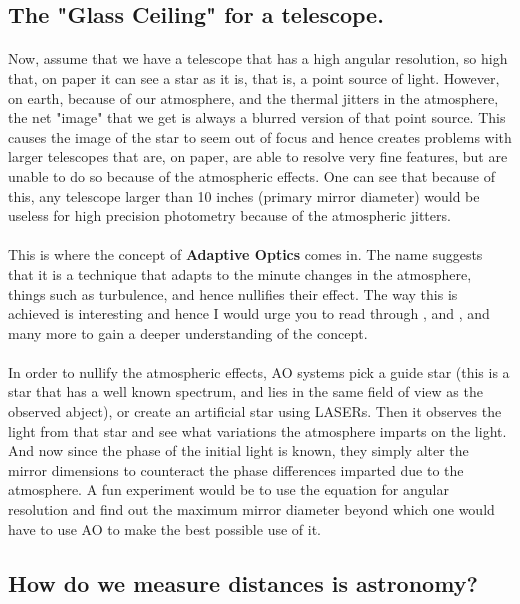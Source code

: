 \documentclass[a4paper,twoside]{article}
\numberwithin{equation}{section}
\begin{document}
\subsection{The "Glass Ceiling" for a telescope.}
\paragraph{}
Now, assume that we have a telescope that has a high angular resolution, so high that, on paper it can see a star as it is, that is, a point source of light. However, on earth, because of our atmosphere, and the thermal jitters in the atmosphere, the net "image" that we get is always a blurred version of that point source. This causes the image of the star to seem out of focus and hence creates problems with larger telescopes that are, on paper, are able to resolve very fine features, but are unable to do so because of the atmospheric effects. One can see that because of this, any telescope larger than 10 inches (primary mirror diameter) would be useless for high precision photometry because of the atmospheric jitters.
\paragraph{}
This is where the concept of \textbf{Adaptive Optics} comes in. The name suggests that it is a technique that adapts to the minute changes in the atmosphere, things such as turbulence, and hence nullifies their effect. The way this is achieved is interesting and hence I would urge you to read through \cite{AO1}, \cite{AO2} and \cite{AO3}, and many more to gain a deeper understanding of the concept. 
\paragraph{}
In order to nullify the atmospheric effects, AO systems pick a guide star (this is a star that has a well known spectrum, and lies in the same field of view as the observed abject), or create an artificial star using LASERs. Then it observes the light from that star and see what variations the atmosphere imparts on the light. And now since the phase of the initial light is known, they simply alter the mirror dimensions to counteract the phase differences imparted due to the atmosphere. A fun experiment would be to use the equation for angular resolution and find out the maximum mirror diameter beyond which one would have to use AO to make the best possible use of it.
\subsection{How do we measure distances is astronomy?}
\end{document}
